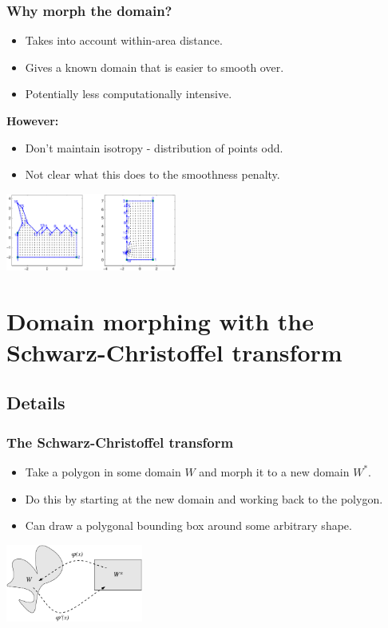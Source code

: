 \documentclass[ignorenonframetext]{beamer} %
\newcommand{\bc}{\begin{center}}
\newcommand{\ec}{\end{center}}
\newcommand{\bi}{\begin{itemize}}
\newcommand{\ei}{\end{itemize}}
\begin{document}
\begin{frame}
	\frametitle{Why morph the domain?}
      \bi
         \item Takes into account within-area distance.
         \item Gives a known domain that is easier to smooth over.
         \item Potentially less computationally intensive. 
      \ei
      \bc
         \textbf{However:}
      \ec
      \bi
         \item Don't maintain isotropy - distribution of points odd.
         \item Not clear what this does to the smoothness penalty.
      \ei
      \bc
         \includegraphics[height=1in]{figs/matlab-test-3}
      \ec
\end{frame}


\section{Domain morphing with the Schwarz-Christoffel transform}

\subsection{Details}

\begin{frame}
	\frametitle{The Schwarz-Christoffel transform}
       \bi
         \item Take a polygon in some domain $W$ and morph it to a new domain $W^*$.
         \item Do this by starting at the new domain and working back to the polygon.
         \item Can draw a polygonal bounding box around some arbitrary shape.
        \ei
        \bc
              \includegraphics[height=1in]{figs/mappingdia}
       \ec
\end{frame}
\end{document}

